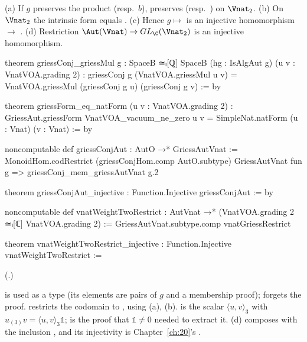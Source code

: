 \begin{theorem}\label{ch21:thm:griessFormNat}
(a) If $g$ preserves the product (resp.\ $b$),  preserves 
(resp.\ ) on $\Vnat_2$.
(b) On $\Vnat_2$ the intrinsic form equals .
(c) Hence $g\mapsto$  is an injective homomorphism  $\to$ .
(d) Restriction $\Aut(\Vnat)\to GL_\C(\Vnat_2)$ is an injective homomorphism.
\end{theorem}
\begin{leancode}
theorem griessConj_griessMul {g : SpaceB ≃ₗ[ℚ] SpaceB} (hg : IsAlgAut g) (u v : VnatVOA.grading 2) :
    griessConj g (VnatVOA.griessMul u v) = VnatVOA.griessMul (griessConj g u) (griessConj g v) := by
\end{leancode}
\begin{leancode}
theorem griessForm_eq_natForm (u v : VnatVOA.grading 2) :
    GriessAut.griessForm VnatVOA_vacuum_ne_zero u v = SimpleNat.natForm (u : Vnat) (v : Vnat) := by
\end{leancode}
\begin{leancode}
noncomputable def griessConjAut : AutO →* GriessAutVnat :=
  MonoidHom.codRestrict (griessConjHom.comp AutO.subtype) GriessAutVnat
    fun g => griessConj_mem_griessAutVnat g.2
\end{leancode}
\begin{leancode}
theorem griessConjAut_injective : Function.Injective griessConjAut := by
\end{leancode}
\begin{leancode}
noncomputable def vnatWeightTwoRestrict : AutVnat →* (VnatVOA.grading 2 ≃ₗ[ℂ] VnatVOA.grading 2) :=
  GriessAutVnat.subtype.comp vnatGriessRestrict
\end{leancode}
\begin{leancode}
theorem vnatWeightTwoRestrict_injective : Function.Injective vnatWeightTwoRestrict :=
\end{leancode}
(.)
\begin{dictionary}
 is used as a type (its elements are pairs of $g$ and a membership proof); 
forgets the proof.   restricts the codomain to , using
(a), (b).   is the scalar $\langle u,v\rangle_3$ with
$u_{(3)}v=\langle u,v\rangle_3\mathbb1$;  is the proof that $\mathbb1\ne0$
needed to extract it.  (d) composes  with the inclusion
, and its injectivity is Chapter~\ref{ch:20}'s
.
\end{dictionary}

